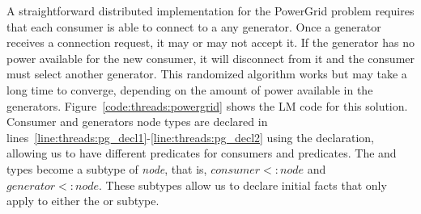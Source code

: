 A straightforward distributed implementation for the PowerGrid problem requires
that each consumer is able to connect to a any generator. Once a generator
receives a connection request, it may or may not accept it. If the generator has
no power available for the new consumer, it will disconnect from it and the
consumer must select another generator. This randomized algorithm works but may
take a long time to converge, depending on the amount of power available in the
generators. Figure~\ref{code:threads:powergrid} shows the LM code for this
solution. Consumer and generators node types are declared in
lines~\ref{line:threads:pg_decl1}-\ref{line:threads:pg_decl2} using the
 declaration, allowing us to have different predicates for consumers
and predicates. The  and  types become a subtype
of \emph{node}, that is, $consumer <: node$ and $generator <: node$.  These
subtypes allow us to declare initial facts that only apply to either the
 or  subtype.


